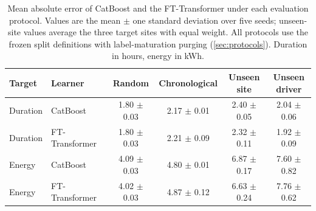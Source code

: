 \begin{table}[!tbp]
\centering\footnotesize
\caption{Mean absolute error of CatBoost and the FT-Transformer under each evaluation protocol. Values are the mean $\pm$ one standard deviation over five seeds; unseen-site values average the three target sites with equal weight. All protocols use the frozen split definitions with label-maturation purging (\cref{sec:protocols}). Duration in hours, energy in kWh.}
\label{tab:accuracy}
\begin{adjustbox}{max width=\textwidth}
\begin{tabular}{llcccc}
\toprule
Target & Learner & Random & Chronological & \makecell{Unseen\\site} & \makecell{Unseen\\driver} \\
\midrule
Duration & CatBoost & 1.80 $\pm$ 0.03 & 2.17 $\pm$ 0.01 & 2.40 $\pm$ 0.05 & 2.04 $\pm$ 0.06 \\
Duration & FT-Transformer & 1.80 $\pm$ 0.03 & 2.21 $\pm$ 0.09 & 2.32 $\pm$ 0.11 & 1.92 $\pm$ 0.09 \\
Energy & CatBoost & 4.09 $\pm$ 0.03 & 4.80 $\pm$ 0.01 & 6.87 $\pm$ 0.17 & 7.60 $\pm$ 0.82 \\
Energy & FT-Transformer & 4.02 $\pm$ 0.03 & 4.87 $\pm$ 0.12 & 6.63 $\pm$ 0.24 & 7.76 $\pm$ 0.62 \\
\bottomrule
\end{tabular}
\end{adjustbox}
\end{table}
